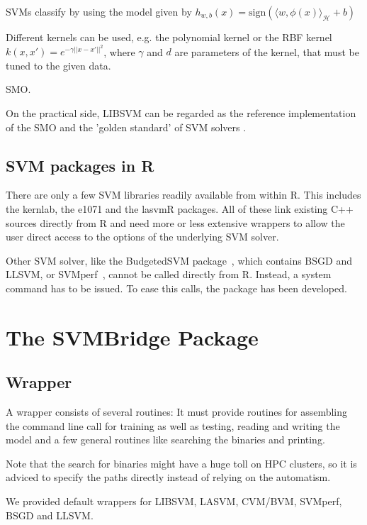 \documentclass[article, shortnames]{jss}
\begin{document}
SVMs classify by using the model given by
$h_{w,b}(x) = \textrm{sign}(\langle w, \phi(x)\rangle_{\mathcal{H}} + b)$

Different kernels can be used, e.g. the polynomial kernel or the 
RBF kernel $k(x,x') = e^{-\gamma || x-x' ||^2}$, where
$\gamma$ and $d$ are parameters of the kernel, that must
be tuned to the given data.

SMO.

On the practical side, LIBSVM can be regarded as the 
reference implementation of the SMO and the 'golden standard'
of SVM solvers \citep{cc01a}.


\subsection{SVM packages in R}

There are only a few SVM libraries readily available from within R.
This includes the kernlab, the e1071 and the lasvmR packages.
All of these link existing C++ sources directly from R and need
more or less extensive wrappers to allow the user direct access to
the options of the underlying SVM solver.

Other SVM solver, like the BudgetedSVM package~\citep{djuric2014budgetedsvm}, 
which contains BSGD and LLSVM, or SVMperf~\citep{joachims2009sparse}, cannot be called directly from R.
Instead, a system command has to be issued.
To ease this calls, the  package has been developed.



\section{The SVMBridge Package}

\subsection{Wrapper}

A wrapper consists of several routines: It must provide routines
for assembling the command line call for training as well as testing,
reading and writing the model and a few general routines like searching
the binaries and printing.

Note that the search for binaries might have a huge toll on HPC clusters,
so it is adviced to specify the paths directly instead of relying on the 
automatism.

We provided default wrappers for LIBSVM, LASVM, CVM/BVM,
SVMperf, BSGD and LLSVM. 
\end{document}
